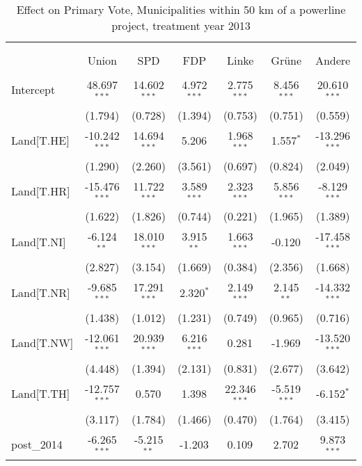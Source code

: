 \begin{table}[!htbp] \centering
  \caption{Effect on Primary Vote, Municipalities within 50 km of a powerline project, treatment year 2013}
\begin{tabular}{@{\extracolsep{5pt}}lcccccc}
\\[-1.8ex]\hline
\hline \\[-1.8ex]
\\[-1.8ex] & \multicolumn{1}{c}{Union} & \multicolumn{1}{c}{SPD} & \multicolumn{1}{c}{FDP} & \multicolumn{1}{c}{Linke} & \multicolumn{1}{c}{Grüne} & \multicolumn{1}{c}{Andere}  \\
\hline \\[-1.8ex]
 Intercept & 48.697$^{***}$ & 14.602$^{***}$ & 4.972$^{***}$ & 2.775$^{***}$ & 8.456$^{***}$ & 20.610$^{***}$ \\
  & (1.794) & (0.728) & (1.394) & (0.753) & (0.751) & (0.559) \\
 Land[T.HE] & -10.242$^{***}$ & 14.694$^{***}$ & 5.206$^{}$ & 1.968$^{***}$ & 1.557$^{*}$ & -13.296$^{***}$ \\
  & (1.290) & (2.260) & (3.561) & (0.697) & (0.824) & (2.049) \\
 Land[T.HR] & -15.476$^{***}$ & 11.722$^{***}$ & 3.589$^{***}$ & 2.323$^{***}$ & 5.856$^{***}$ & -8.129$^{***}$ \\
  & (1.622) & (1.826) & (0.744) & (0.221) & (1.965) & (1.389) \\
 Land[T.NI] & -6.124$^{**}$ & 18.010$^{***}$ & 3.915$^{**}$ & 1.663$^{***}$ & -0.120$^{}$ & -17.458$^{***}$ \\
  & (2.827) & (3.154) & (1.669) & (0.384) & (2.356) & (1.668) \\
 Land[T.NR] & -9.685$^{***}$ & 17.291$^{***}$ & 2.320$^{*}$ & 2.149$^{***}$ & 2.145$^{**}$ & -14.332$^{***}$ \\
  & (1.438) & (1.012) & (1.231) & (0.749) & (0.965) & (0.716) \\
 Land[T.NW] & -12.061$^{***}$ & 20.939$^{***}$ & 6.216$^{***}$ & 0.281$^{}$ & -1.969$^{}$ & -13.520$^{***}$ \\
  & (4.448) & (1.394) & (2.131) & (0.831) & (2.677) & (3.642) \\
 Land[T.TH] & -12.757$^{***}$ & 0.570$^{}$ & 1.398$^{}$ & 22.346$^{***}$ & -5.519$^{***}$ & -6.152$^{*}$ \\
  & (3.117) & (1.784) & (1.466) & (0.470) & (1.764) & (3.415) \\
 post_2014 & -6.265$^{***}$ & -5.215$^{**}$ & -1.203$^{}$ & 0.109$^{}$ & 2.702$^{}$ & 9.873$^{***}$ \\

\end{tabular}
\end{table}
